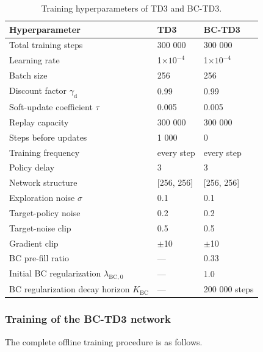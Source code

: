 \begin{table}[htbp]
\centering
\caption{Training hyperparameters of TD3 and BC-TD3.}
\label{tab:hyperparams}
\small
\begin{tabularx}{\linewidth}{lXX}
\toprule
Hyperparameter & TD3 & BC-TD3 \\
\midrule
Total training steps & 300 000 & 300 000 \\
Learning rate & 1$\times$$10^{-4}$ & 1$\times$$10^{-4}$ \\
Batch size & 256 & 256 \\
Discount factor $\gamma_{\mathrm{d}}$ & 0.99 & 0.99 \\
Soft-update coefficient $\tau$ & 0.005 & 0.005 \\
Replay capacity & 300 000 & 300 000 \\
Steps before updates & 1 000 & 0 \\
Training frequency & every step & every step \\
Policy delay & 3 & 3 \\
Network structure & [256, 256] & [256, 256] \\
Exploration noise $\sigma$ & 0.1 & 0.1 \\
Target-policy noise & 0.2 & 0.2 \\
Target-noise clip & 0.5 & 0.5 \\
Gradient clip & $\pm$10 & $\pm$10 \\
BC pre-fill ratio & --- & 0.33 \\
Initial BC regularization $\lambda_{\mathrm{BC},0}$ & --- & 1.0 \\
BC regularization decay horizon $K_{\mathrm{BC}}$ & --- & 200 000 steps \\
\bottomrule
\end{tabularx}
\end{table}
\FloatBarrier
\subsubsection{Training of the BC-TD3 network}
The complete offline training procedure is as follows.


